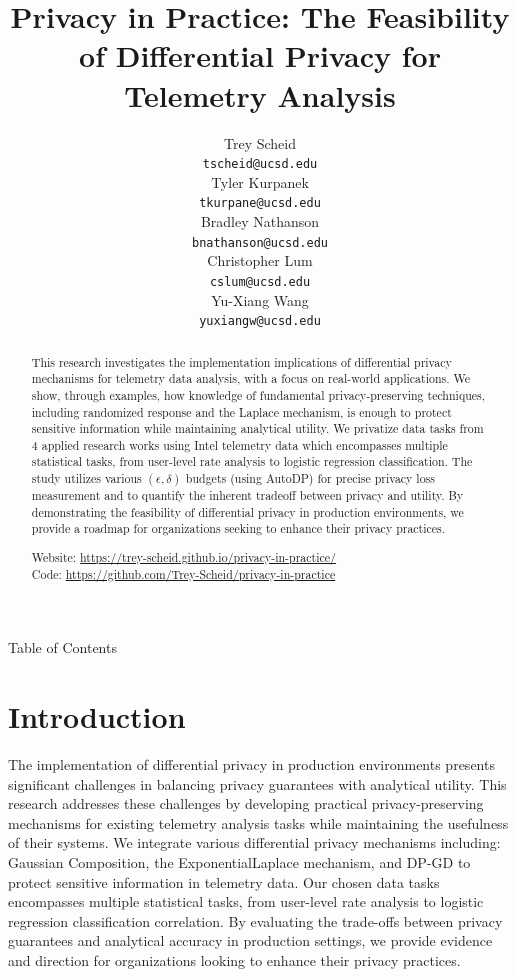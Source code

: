 \documentclass[12pt,letterpaper]{article}
\title{Privacy in Practice: The Feasibility of Differential Privacy for Telemetry Analysis}
\author{Trey Scheid \\
  {\tt tscheid@ucsd.edu} \\\And
  Tyler Kurpanek \\
  {\tt tkurpane@ucsd.edu} \\\And
  Bradley Nathanson \\
  {\tt bnathanson@ucsd.edu} \\\And
  Christopher Lum \\
  {\tt cslum@ucsd.edu} \\\And
  Yu-Xiang Wang \\
  {\tt yuxiangw@ucsd.edu} \\}
\begin{document}
\maketitle




\begin{abstract}    
  This research investigates the implementation implications of differential privacy mechanisms for telemetry data analysis, with a focus on real-world applications. We show, through examples, how knowledge of fundamental privacy-preserving techniques, including randomized response and the Laplace mechanism, is enough to protect sensitive information while maintaining analytical utility. We privatize data tasks from 4 applied research works using Intel telemetry data which   encompasses multiple statistical tasks, from user-level rate analysis to logistic regression classification. The study utilizes various $(\epsilon, \delta)$ budgets (using AutoDP) for precise privacy loss measurement and to quantify the inherent tradeoff between privacy and utility. By demonstrating the feasibility of differential privacy in production environments, we provide a roadmap for organizations seeking to enhance their privacy practices.
  \begin{center}
    Website: \url{https://trey-scheid.github.io/privacy-in-practice/} \\
    Code: \url{https://github.com/Trey-Scheid/privacy-in-practice}
  \end{center}
\end{abstract}

\clearpage

{\Large\bf\raggedright Table of Contents}

\maketoc

\clearpage


\section{Introduction}

The implementation of differential privacy in production environments presents significant challenges in balancing privacy guarantees with analytical utility. This research addresses these challenges by developing practical privacy-preserving mechanisms for existing telemetry analysis tasks while maintaining the usefulness of their systems. We integrate various differential privacy mechanisms including: Gaussian Composition, the Exponential\/Laplace mechanism, and DP-GD to protect sensitive information in telemetry data. Our chosen data tasks encompasses multiple statistical tasks, from user-level rate analysis to logistic regression classification correlation. By evaluating the trade-offs between privacy guarantees and analytical accuracy in production settings, we provide evidence and direction for organizations looking to enhance their privacy practices.
\end{document}
